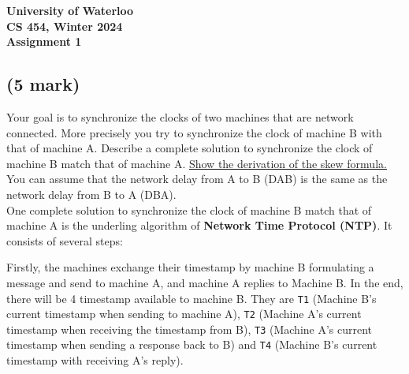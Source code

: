 \documentclass[11pt]{article}
\begin{document}
\begin{center}
  {\Large\bf University of Waterloo}\\ \vspace{3mm}
  {\Large\bf CS 454, Winter 2024}\\ \vspace{2mm}
  {\Large\bf Assignment 1}\\ \vspace{3mm}
\end{center}

\def\question#1{\item[\bf #1.]}
\def\part#1{\item[\bf #1)]}
\newcommand{\pc}[1]{\mbox{\textbf{#1}}} %

\subsection{(5 mark)} 

Your goal is to synchronize the clocks of two machines that are network connected. More precisely you try to synchronize the clock of machine B with that of machine A. Describe a complete solution to synchronize the clock of machine B match that of machine A. \underline{Show the derivation of the skew formula.} You can assume that the network delay from A to B (DAB) is the same as the network delay from B to A (DBA).\\

One complete solution to synchronize the clock of machine B match that of machine A is the underling algorithm of \textbf{Network Time Protocol (NTP)}. It consists of several steps:

Firstly, the machines exchange their timestamp by machine B formulating a message and send to machine A, and machine A replies to Machine B. In the end, there will be 4 timestamp available to machine B. They are \texttt{T1} (Machine B's current timestamp when sending to machine A), \texttt{T2} (Machine A's current timestamp when receiving the timestamp from B), \texttt{T3} (Machine A's current timestamp when sending a response back to B) and \texttt{T4} (Machine B's current timestamp with receiving A's reply).
\end{document}
